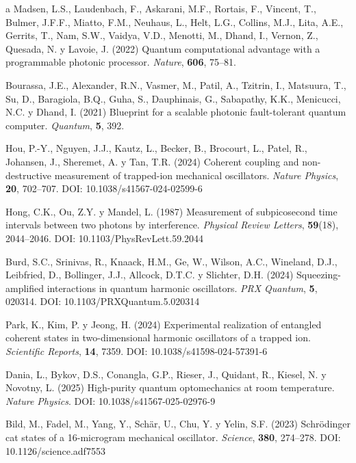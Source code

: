 \documentclass[11pt,a4paper,spanish]{book}
\begin{document}
\begin{thebibliography}{a}
 Madsen, L.S., Laudenbach, F., Askarani, M.F., Rortais, F., Vincent, T., Bulmer, J.F.F., Miatto, F.M., Neuhaus, L., Helt, L.G., Collins, M.J., Lita, A.E., Gerrits, T., Nam, S.W., Vaidya, V.D., Menotti, M., Dhand, I., Vernon, Z., Quesada, N. y Lavoie, J. (2022) Quantum computational advantage with a programmable photonic processor. \textit{Nature}, \textbf{606}, 75--81.

 Bourassa, J.E., Alexander, R.N., Vasmer, M., Patil, A., Tzitrin, I., Matsuura, T., Su, D., Baragiola, B.Q., Guha, S., Dauphinais, G., Sabapathy, K.K., Menicucci, N.C. y Dhand, I. (2021) Blueprint for a scalable photonic fault-tolerant quantum computer. \textit{Quantum}, \textbf{5}, 392.


 Hou, P.-Y., Nguyen, J.J., Kautz, L., Becker, B., Brocourt, L., Patel, R., Johansen, J., Sheremet, A. y Tan, T.R. (2024) Coherent coupling and non-destructive measurement of trapped-ion mechanical oscillators. \textit{Nature Physics}, \textbf{20}, 702--707. DOI: 10.1038/s41567-024-02599-6

 Hong, C.K., Ou, Z.Y. y Mandel, L. (1987) Measurement of subpicosecond time intervals between two photons by interference. \textit{Physical Review Letters}, \textbf{59}(18), 2044--2046. DOI: 10.1103/PhysRevLett.59.2044

 Burd, S.C., Srinivas, R., Knaack, H.M., Ge, W., Wilson, A.C., Wineland, D.J., Leibfried, D., Bollinger, J.J., Allcock, D.T.C. y Slichter, D.H. (2024) Squeezing-amplified interactions in quantum harmonic oscillators. \textit{PRX Quantum}, \textbf{5}, 020314. DOI: 10.1103/PRXQuantum.5.020314

 Park, K., Kim, P. y Jeong, H. (2024) Experimental realization of entangled coherent states in two-dimensional harmonic oscillators of a trapped ion. \textit{Scientific Reports}, \textbf{14}, 7359. DOI: 10.1038/s41598-024-57391-6

 Dania, L., Bykov, D.S., Conangla, G.P., Rieser, J., Quidant, R., Kiesel, N. y Novotny, L. (2025) High-purity quantum optomechanics at room temperature. \textit{Nature Physics}. DOI: 10.1038/s41567-025-02976-9

 Bild, M., Fadel, M., Yang, Y., Schär, U., Chu, Y. y Yelin, S.F. (2023) Schrödinger cat states of a 16-microgram mechanical oscillator. \textit{Science}, \textbf{380}, 274--278. DOI: 10.1126/science.adf7553


\end{thebibliography}
\end{document}
